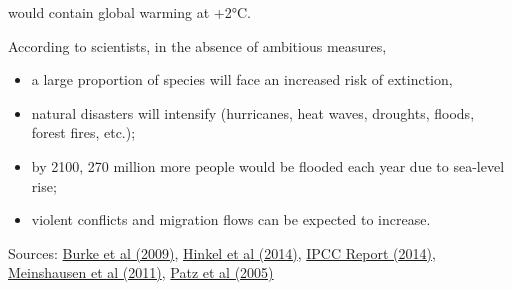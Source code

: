 \documentclass[12pt]{article} %
\begin{document}
\begin{appendices}
\begin{itemize}
would contain global warming at +2°C. 
\end{itemize}
According to scientists, in the absence of ambitious measures, 
\begin{itemize}
\item a large proportion of species will face an increased risk of extinction,
\item natural disasters will intensify (hurricanes, heat waves, droughts,
floods, forest fires, etc.); 
\item by 2100, 270 million more people would be flooded each year due to
sea-level rise; 
\item violent conflicts and migration flows can be expected to increase. 
\end{itemize}
Sources: \href{http://www.pnas.org/content/106/49/20670}{Burke et al (2009)},
\href{http://www.pnas.org/content/pnas/early/2014/01/29/1222469111.full.pdf}{Hinkel et al (2014)},
\href{http://www.ipcc.ch/report/ar5/syr/}{IPCC Report (2014)}, \href{https://link.springer.com/article/10.1007/s10584-011-0156-z}{Meinshausen et al (2011)},
\href{https://www.nature.com/articles/nature04188}{Patz et al (2005)}




\end{appendices}
\end{document}
